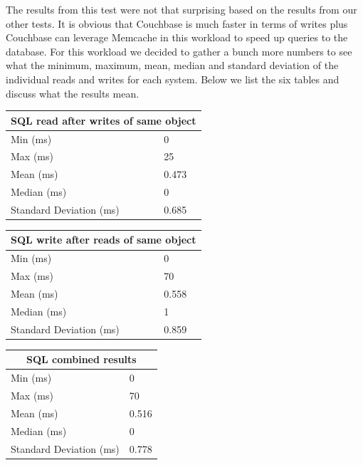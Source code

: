 \documentclass[]{IEEEtran}
\begin{document}
The results from this test were not that surprising based on the results from our other tests. It is obvious that Couchbase is much faster in terms of writes plus Couchbase can leverage Memcache in this workload to speed up queries to the database. For this workload we decided to gather a bunch more numbers to see what the minimum, maximum, mean, median and standard deviation of the individual reads and writes for each system. Below we list the six tables and discuss what the results mean.

\begin{center}
\begin{tabular}{|l|l|}
	\hline
  	\multicolumn{2}{|c|}{{\bf SQL read after writes of same object}} \\
 	\hline
  	 Min (ms) & 0 \\
  	\hline
         Max (ms) & 25 \\
  	\hline
  	Mean (ms) & 0.473 \\
 	\hline
  	Median (ms) & 0 \\
  	\hline
         Standard Deviation (ms) & 0.685 \\
  	\hline
\end{tabular}
\end{center}

\begin{center}
\begin{tabular}{|l|l|}
	\hline
  	\multicolumn{2}{|c|}{{\bf SQL write after reads of same object}} \\
 	\hline
  	 Min (ms) & 0 \\
  	\hline
         Max (ms) & 70 \\
  	\hline
  	Mean (ms) & 0.558 \\
 	\hline
  	Median (ms) & 1 \\
  	\hline
         Standard Deviation (ms) & 0.859 \\
  	\hline
\end{tabular}
\end{center}

\begin{center}
\begin{tabular}{|l|l|}
	\hline
  	\multicolumn{2}{|c|}{{\bf SQL combined results}} \\
 	\hline
  	 Min (ms) & 0 \\
  	\hline
         Max (ms) & 70 \\
  	\hline
  	Mean (ms) & 0.516 \\
 	\hline
  	Median (ms) & 0 \\
  	\hline
         Standard Deviation (ms) & 0.778 \\
  	\hline
\end{tabular}
\end{center}
\end{document}
